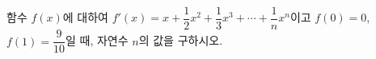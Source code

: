 함수 $f(x)$에 대하여 $f'(x)=x+\dfrac{1}{2}x^2+\dfrac{1}{3}x^3+\cdots+\dfrac{1}{n}x^n$이고 $f(0)=0$, $f(1)=\dfrac{9}{10}$일 때, 자연수 $n$의 값을 구하시오.
